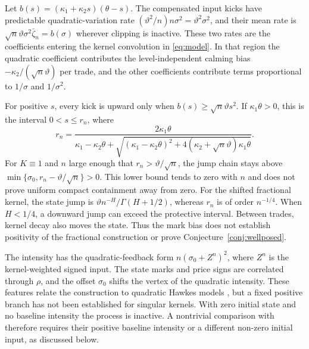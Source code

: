 \documentclass[11pt,a4paper]{article}
\theoremstyle{definition}
\begin{document}
Let $b(s)=(\kappa_1+\kappa_2s)(\theta-s)$. The compensated input kicks have predictable quadratic-variation rate $(\vartheta^2/n)n\sigma^2=\vartheta^2\sigma^2$, and their mean rate is $\sqrt n\vartheta\sigma^2\bar\zeta_n=b(\sigma)$ wherever clipping is inactive. These two rates are the coefficients entering the kernel convolution in \eqref{eq:model}. In that region the quadratic coefficient contributes the level-independent calming bias $-\kappa_2/(\sqrt n\vartheta)$ per trade, and the other coefficients contribute terms proportional to $1/\sigma$ and $1/\sigma^2$.

For positive $s$, every kick is upward only when $b(s)\ge\sqrt n\vartheta s^2$. If $\kappa_1\theta>0$, this is the interval $0<s\le r_n$, where
\begin{equation*}
r_n=\frac{2\kappa_1\theta}{\kappa_1-\kappa_2\theta+\sqrt{(\kappa_1-\kappa_2\theta)^2+4(\kappa_2+\sqrt n\vartheta)\kappa_1\theta}}.
\end{equation*}
For $K\equiv1$ and $n$ large enough that $r_n>\vartheta/\sqrt n$, the jump chain stays above $\min\{\sigma_0,r_n-\vartheta/\sqrt n\}>0$. This lower bound tends to zero with $n$ and does not prove uniform compact containment away from zero. For the shifted fractional kernel, the state jump is $\vartheta n^{-H}/\Gamma(H+1/2)$, whereas $r_n$ is of order $n^{-1/4}$. When $H<1/4$, a downward jump can exceed the protective interval. Between trades, kernel decay also moves the state. Thus the mark bias does not establish positivity of the fractional construction or prove Conjecture~\ref{conj:wellposed}.

The intensity has the quadratic-feedback form $n(\sigma_0+Z^n)^2$, where $Z^n$ is the kernel-weighted signed input. The state marks and price signs are correlated through $\rho$, and the offset $\sigma_0$ shifts the vertex of the quadratic intensity. These features relate the construction to quadratic Hawkes models \citep{BlancDonierBouchaud2017}, but a fixed positive branch has not been established for singular kernels. With zero initial state and no baseline intensity the process is inactive. A nontrivial comparison with \citet{DandapaniJusselinRosenbaum2021} therefore requires their positive baseline intensity or a different non-zero initial input, as discussed below.
\end{document}
